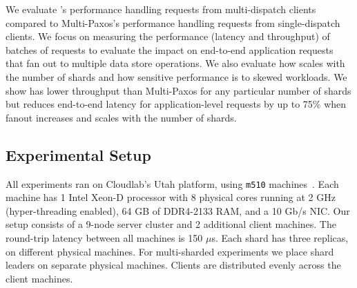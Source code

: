 We evaluate \sys{}'s performance handling requests from multi-dispatch clients
compared to Multi-Paxos's performance handling requests from single-dispatch
clients.  We focus on measuring the performance (latency and throughput) of
batches of requests to evaluate the impact on end-to-end application
requests that fan out to multiple data store operations. We also evaluate how
\sys{} scales with the number of shards and how sensitive performance is to
skewed workloads.
We show \sys{} has lower throughput than Multi-Paxos for any particular
number of shards but reduces end-to-end latency for application-level requests
by up to 75\% when fanout increases and scales with the number of shards.

\subsection{Experimental Setup}
All experiments ran on Cloudlab's Utah platform, using
\texttt{m510} machines~\cite{duplyakin2019cloudlab}.  Each machine has 1 Intel Xeon-D processor with 8 physical cores
running at 2 GHz (hyper-threading enabled), 64 GB of DDR4-2133 RAM, and a 10
Gb/s NIC\@.  Our setup consists of a 9-node server cluster and 2 additional client machines.
The round-trip latency between all machines is 150 $\mu$s.  Each shard has three replicas,
on different physical machines. For multi-sharded experiments we place
shard leaders on separate physical machines. Clients are distributed
evenly across the client machines.

